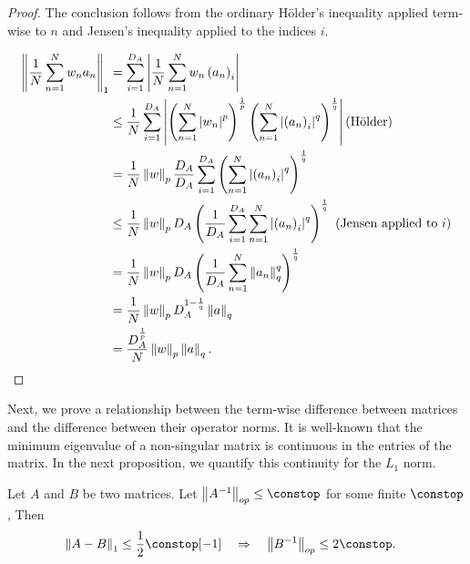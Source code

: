\begin{proof}
The conclusion follows from the ordinary H{\"o}lder's inequality
applied term-wise to $n$ and Jensen's inequality applied to the indices
$i$.

\begin{align*}
\left\Vert \frac{1}{N}\sum_{n=1}^{N}w_{n}a_{n}\right\Vert_{1} & =\sum_{i=1}^{D_{A}}\left|\frac{1}{N}\sum_{n=1}^{N}w_{n}\left(a_{n}\right)_{i}\right|\\
 & \le\frac{1}{N}\sum_{i=1}^{D_{A}}\left|\left(\sum_{n=1}^{N}\left|w_{n}\right|^{p}\right)^{\frac{1}{p}}\left(\sum_{n=1}^{N}\left|\left(a_{n}\right)_{i}\right|^{q}\right)^{\frac{1}{q}}\right|\text{(H{\"o}lder)}\\
 & =\frac{1}{N}\left\Vert w\right\Vert_{p}\frac{D_{A}}{D_{A}}\sum_{i=1}^{D_{A}}\left(\sum_{n=1}^{N}\left|\left(a_{n}\right)_{i}\right|^{q}\right)^{\frac{1}{q}}\\
 & \le\frac{1}{N}\left\Vert w\right\Vert_{p}D_{A}\left(\frac{1}{D_{A}}\sum_{i=1}^{D_{A}}\sum_{n=1}^{N}\left|\left(a_{n}\right)_{i}\right|^{q}\right)^{\frac{1}{q}}\textrm{ (Jensen applied to }i\textrm{)}\\
 & =\frac{1}{N}\left\Vert w\right\Vert_{p}D_{A}\left(\frac{1}{D_{A}}\sum_{n=1}^{N}\left\Vert a_{n}\right\Vert_{q}^{q}\right)^{\frac{1}{q}}\\
 & =\frac{1}{N}\left\Vert w\right\Vert_{p}D_{A}^{1-\frac{1}{q}}\left\Vert a\right\Vert_{q}\\
 & =\frac{D_{A}^{\frac{1}{p}}}{N}\left\Vert w\right\Vert_{p}\left\Vert a\right\Vert_{q}.
\end{align*}
\end{proof}
%
Next, we prove a relationship between the term-wise difference between
matrices and the difference between their operator norms. It is well-known
that the minimum eigenvalue of a non-singular matrix is continuous
in the entries of the matrix. In the next proposition, we quantify
this continuity for the $L_{1}$ norm.
\begin{prop}
\label{propref:operator_norm_continuity}Let $A$ and $B$ be two
matrices. Let $\norm{A^{-1}}_{op}\le\constop$ for some finite $\constop$,
Then
\begin{align*}
\norm{A-B}_{1}\le\frac{1}{2}\constop[-1] & \quad\Rightarrow\quad\norm{B^{-1}}_{op}\le2\constop.
\end{align*}
\end{prop}
